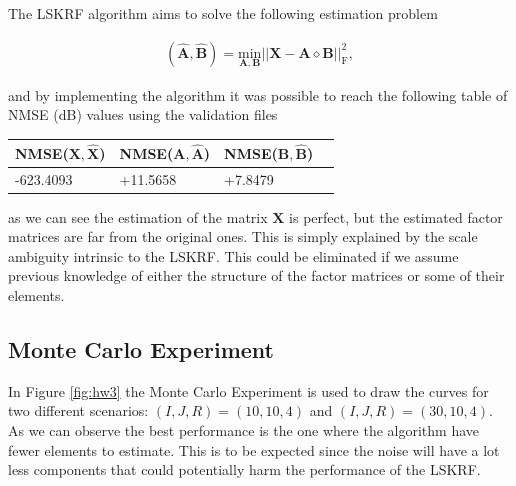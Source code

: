 \documentclass[a4paper,10pt]{article}
\begin{document}
    The LSKRF algorithm aims to solve the following estimation problem 

    \begin{align}
        \left(\hat{\boldsymbol{A}}, \hat{\boldsymbol{B}}\right) = \underset{\boldsymbol{A}, \boldsymbol{B}}{\text{min}} \left|\left| \boldsymbol{X} - \boldsymbol{A} \diamond \boldsymbol{B} \right|\right|^2_{\text{F}},
    \end{align}

    and by implementing the algorithm it was possible to reach the following table of NMSE (dB) values using the validation files 

    \begin{table}[ht!]
        \centering
        \begin{tabular}{|l|l|l|l|}
        \hline
        NMSE($\boldsymbol{X}, \boldsymbol{\hat{X}}$) & NMSE($\boldsymbol{A}, \boldsymbol{\hat{A}}$) & NMSE($\boldsymbol{B}, \boldsymbol{\hat{B}}$) \\ \hline
        -623.4093 & +11.5658 & +7.8479 \\ \hline
        \end{tabular}
    \end{table}

    as we can see the estimation of the matrix $\boldsymbol{X}$ is perfect, but the estimated factor matrices are far from the original ones. This is simply explained by 
    the scale ambiguity intrinsic to the LSKRF. This could be eliminated if we assume previous knowledge of either the structure of the factor matrices or some of their elements.

    \subsection*{Monte Carlo Experiment}

    In Figure \ref{fig:hw3} the Monte Carlo Experiment is used to draw the curves for two different scenarios: $(I,J,R) = (10,10,4)$ and $(I,J,R) = (30,10,4)$. 
    As we can observe the best performance is the one where the algorithm have fewer elements to estimate. This is to be expected since the noise will have a lot less
    components that could potentially harm the performance of the LSKRF.
\end{document}

